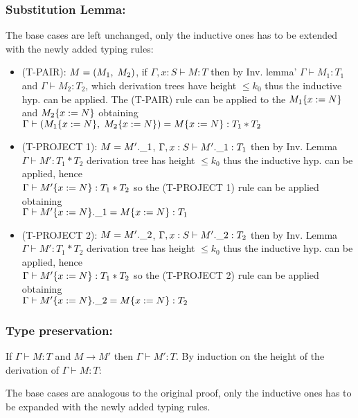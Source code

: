 \subsubsection*{Substitution Lemma:}

The base cases are left unchanged, only the inductive ones has to be extended with the newly
added typing rules:
\begin{itemize}
	\item (T-PAIR): $M = (M_1,\;M_2)$, if $\Gamma, x: S \vdash M: T$ then by Inv. lemma'
	      $\Gamma \vdash M_1: T_1$ and $\Gamma \vdash M_2: T_2$, which derivation trees have
	      height $\le k_0$ thus the inductive hyp. can be applied. The (T-PAIR) rule can be
	      applied to the $M_1\{x:=N\}$ and $M_2\{x:=N\}$ obtaining\\
	      $\Gamma \vdash (M_1\{x:=N\},\;M_2\{x:=N\}) = M\{x:=N\} : T_1 * T_2$
	\item (T-PROJECT 1): $M = M'.\_1$, $\Gamma, x:S \vdash M'.\_1 : T_1$ then by
	      Inv. Lemma $\Gamma \vdash M' : T_1 \ast T_2$ derivation tree has height
	      $\le k_0$ thus the inductive hyp. can be applied, hence\\
	      $\Gamma \vdash M'\{x:=N\}: T_1 \ast T_2$ so the (T-PROJECT 1) rule can be applied
	      obtaining\\
	      $\Gamma \vdash M'\{x:=N\}.\_1 = M\{x:=N\}: T_1$
	\item (T-PROJECT 2): $M = M'.\_2$, $\Gamma, x:S \vdash M'.\_2 : T_2$ then by
	      Inv. Lemma $\Gamma \vdash M' : T_1 \ast T_2$ derivation tree has height
	      $\le k_0$ thus the inductive hyp. can be applied, hence\\
	      $\Gamma \vdash M'\{x:=N\}: T_1 \ast T_2$ so the (T-PROJECT 2) rule can be applied
	      obtaining\\
	      $\Gamma \vdash M'\{x:=N\}.\_2 = M\{x:=N\}: T_2$
\end{itemize}

\subsubsection*{Type preservation:}
If $\Gamma \vdash M: T$ and $M \to M'$ then $\Gamma \vdash M': T$. By induction on the height of
the derivation of $\Gamma \vdash M: T$:

The base cases are analogous to the original proof, only the inductive ones has to be expanded
with the newly added typing rules.

